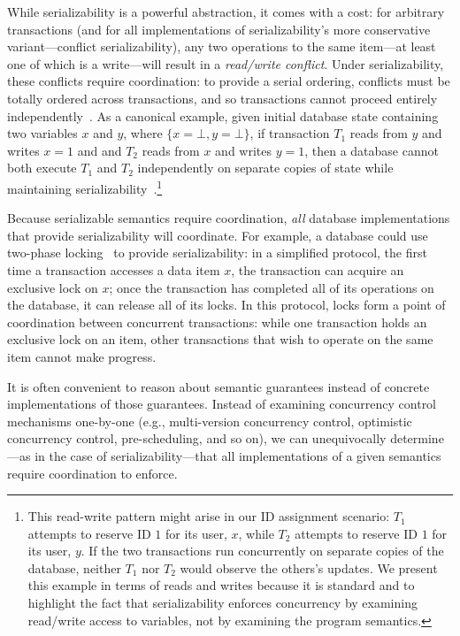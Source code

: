 While serializability is a powerful abstraction, it comes with a cost:
for arbitrary transactions (and for all implementations of
serializability's more conservative variant---conflict
serializability), any two operations to the same item---at least one
of which is a write---will result in a \textit{read/write
  conflict}. Under serializability, these conflicts require
coordination: to provide a serial ordering, conflicts must be totally
ordered across transactions, and so transactions cannot proceed
entirely independently~\cite{bernstein-book}. As a canonical example,
given initial database state containing two variables $x$ and $y$,
where $\{x=\bot, y=\bot\}$, if transaction $T_1$ reads from $y$ and
writes $x=1$ and and $T_2$ reads from $x$ and writes $y=1$, then a
database cannot both execute $T_1$ and $T_2$ independently on separate
copies of state while maintaining
serializability~\cite{davidson-survey,hat-vldb}.\footnote{This
  read-write pattern might arise in our ID assignment scenario: $T_1$
  attempts to reserve ID $1$ for its user, $x$, while $T_2$ attempts
  to reserve ID $1$ for its user, $y$. If the two transactions run
  concurrently on separate copies of the database, neither $T_1$ nor
  $T_2$ would observe the others's updates. We present this example in
  terms of reads and writes because it is standard and to highlight
  the fact that serializability enforces concurrency by examining
  read/write access to variables, not by examining the program
  semantics.}

Because serializable semantics require coordination, \textit{all}
database implementations that provide serializability will
coordinate. For example, a database could use two-phase
locking~\cite{gray-isolation} to provide serializability: in a
simplified protocol, the first time a transaction accesses a data
item $x$, the transaction can acquire an exclusive lock on $x$; once
the transaction has completed all of its operations on the database,
it can release all of its locks. In this protocol, locks form a point
of coordination between concurrent transactions: while one transaction
holds an exclusive lock on an item, other transactions that wish to
operate on the same item cannot make progress.

 It is often
convenient to reason about semantic guarantees instead of concrete
implementations of those guarantees. Instead of examining concurrency
control mechanisms one-by-one (e.g., multi-version concurrency
control, optimistic concurrency control, pre-scheduling, and so on),
we can unequivocally determine---as in the case of
serializability---that all implementations of a given semantics
require coordination to enforce.

